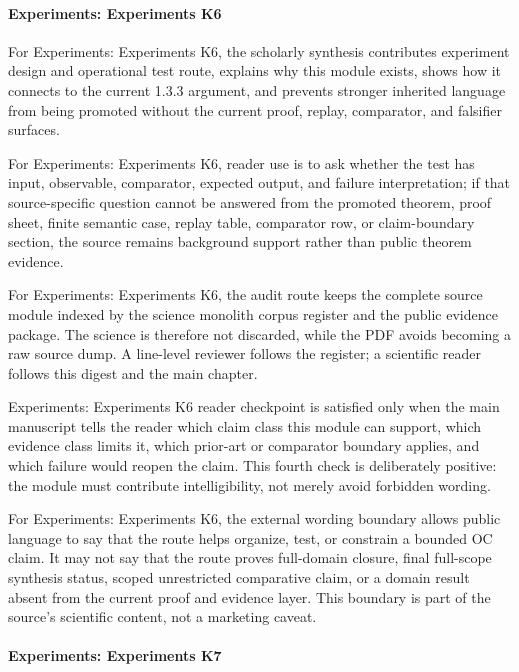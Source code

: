 \paragraph{Experiments: Experiments K6}

For Experiments: Experiments K6, the scholarly synthesis contributes experiment design and operational test route, explains why this module exists, shows how it connects to the current 1.3.3 argument, and prevents stronger inherited language from being promoted without the current proof, replay, comparator, and falsifier surfaces.


For Experiments: Experiments K6, reader use is to ask whether the test has input, observable, comparator, expected output, and failure interpretation; if that source-specific question cannot be answered from the promoted theorem, proof sheet, finite semantic case, replay table, comparator row, or claim-boundary section, the source remains background support rather than public theorem evidence.


For Experiments: Experiments K6, the audit route keeps the complete source module indexed by the science monolith corpus register and the public evidence package. The science is therefore not discarded, while the PDF avoids becoming a raw source dump. A line-level reviewer follows the register; a scientific reader follows this digest and the main chapter.


Experiments: Experiments K6 reader checkpoint is satisfied only when the main manuscript tells the reader which claim class this module can support, which evidence class limits it, which prior-art or comparator boundary applies, and which failure would reopen the claim. This fourth check is deliberately positive: the module must contribute intelligibility, not merely avoid forbidden wording.


For Experiments: Experiments K6, the external wording boundary allows public language to say that the route helps organize, test, or constrain a bounded OC claim. It may not say that the route proves full-domain closure, final full-scope synthesis status, scoped unrestricted comparative claim, or a domain result absent from the current proof and evidence layer. This boundary is part of the source's scientific content, not a marketing caveat.


\paragraph{Experiments: Experiments K7}

